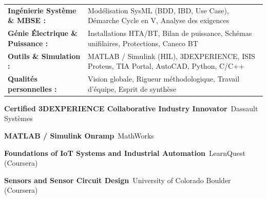 \documentclass[10pt,a4paper]{../altacv}
\begin{document}
{\small
\begin{tabular}{@{}ll@{}}
\textbf{Ingénierie Système \& MBSE :} & Modélisation SysML (BDD, IBD, Use Case), Démarche Cycle en V, Analyse des exigences \\[1.5pt]
\textbf{Génie Électrique \& Puissance :} & Installations HTA/BT, Bilan de puissance, Schémas unifilaires, Protections, Caneco BT \\[1.5pt]
\textbf{Outils \& Simulation :} & MATLAB / Simulink (HIL), 3DEXPERIENCE, ISIS Proteus, TIA Portal, AutoCAD, Python, C/C++ \\[1.5pt]
\textbf{Qualités personnelles :} & Vision globale, Rigueur méthodologique, Travail d’équipe, Esprit de synthèse
\end{tabular}
}

\begin{cvitems}
  \item \textbf{Certified 3DEXPERIENCE Collaborative Industry Innovator}~\hfill {\color{emphasis}Dassault Systèmes}
  \item \textbf{MATLAB / Simulink Onramp}~\hfill {\color{emphasis}MathWorks}
  \item \textbf{Foundations of IoT Systems and Industrial Automation}~\hfill {\color{emphasis}LearnQuest (Coursera)}
  \item \textbf{Sensors and Sensor Circuit Design}~\hfill {\color{emphasis}University of Colorado Boulder (Coursera)}
\end{cvitems}

\cvactivites
\cvlangues
\end{document}
